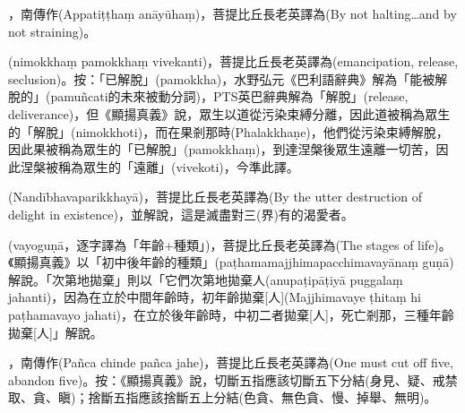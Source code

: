 \startitemgroup[noteitems]
\item{}，南傳作(Appatiṭṭhaṃ anāyūhaṃ)，菩提比丘長老英譯為(By not halting…and by not straining)。
\stopitemgroup

\startitemgroup[noteitems]
\item{}(nimokkhaṃ pamokkhaṃ vivekanti)，菩提比丘長老英譯為(emancipation, release, seclusion)。按：「已解脫」(pamokkha)，水野弘元《巴利語辭典》解為「能被解脫的」(pamuñcati的未來被動分詞)，PTS英巴辭典解為「解脫」(release, deliverance)，但《顯揚真義》說，眾生以道從污染束縛分離，因此道被稱為眾生的「解脫」(nimokkhoti)，而在果剎那時(Phalakkhaṇe)，他們從污染束縛解脫，因此果被稱為眾生的「已解脫」(pamokkhaṃ)，到達涅槃後眾生遠離一切苦，因此涅槃被稱為眾生的「遠離」(vivekoti)，今準此譯。
\stopitemgroup

\startitemgroup[noteitems]
\item{}(Nandībhavaparikkhayā)，菩提比丘長老英譯為(By the utter destruction of delight in existence)，並解說，這是滅盡對三(界)有的渴愛者。
\stopitemgroup

\startitemgroup[noteitems]
\item{}(vayoguṇā，逐字譯為「年齡+種類」)，菩提比丘長老英譯為(The stages of life)。《顯揚真義》以「初中後年齡的種類」(paṭhamamajjhimapacchimavayānaṃ guṇā)解說。「次第地拋棄」則以「它們次第地拋棄人(anupaṭipāṭiyā puggalaṃ jahanti)，因為在立於中間年齡時，初年齡拋棄[人](Majjhimavaye ṭhitaṃ hi paṭhamavayo jahati)，在立於後年齡時，中初二者拋棄[人]，死亡剎那，三種年齡拋棄[人]」解說。
\stopitemgroup

\startitemgroup[noteitems]
\item{}，南傳作(Pañca chinde pañca jahe)，菩提比丘長老英譯為(One must cut off five, abandon five)。按：《顯揚真義》說，切斷五指應該切斷五下分結(身見、疑、戒禁取、貪、瞋)；捨斷五指應該捨斷五上分結(色貪、無色貪、慢、掉舉、無明)。
\stopitemgroup

